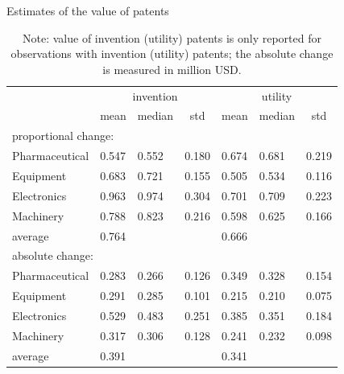 \documentclass[English]{article}
\begin{document}
\begin{table}[H]
\centering
\caption{Estimates of the value of patents}
\label{T18}
\begin{tabular}{lllcllc}
\hline\hline
                     &\multicolumn{3}{c}{invention} &\multicolumn{3}{c}{utility} \\
                        & mean  & median & std   & mean            & median & std   \\
\hline
\multicolumn{7}{l}{proportional change:} \\
Pharmaceutical & 0.547 & 0.552 & 0.180 & 0.674 & 0.681 & 0.219 \\
Equipment      & 0.683 & 0.721 & 0.155 & 0.505 & 0.534 & 0.116 \\
Electronics    & 0.963 & 0.974 & 0.304 & 0.701 & 0.709 & 0.223 \\
Machinery      & 0.788 & 0.823 & 0.216 & 0.598 & 0.625 & 0.166 \\
average        & 0.764 &       &       & 0.666 &       &       \\
\hline
\multicolumn{7}{l}{absolute change:} \\
Pharmaceutical & 0.283 & 0.266 & 0.126 & 0.349 & 0.328 & 0.154 \\
Equipment      & 0.291 & 0.285 & 0.101 & 0.215 & 0.210 & 0.075 \\
Electronics    & 0.529 & 0.483 & 0.251 & 0.385 & 0.351 & 0.184 \\
Machinery      & 0.317 & 0.306 & 0.128 & 0.241 & 0.232 & 0.098 \\
average        & 0.391 &       &       & 0.341 &       &       \\
\hline\hline
\end{tabular}
\caption*{\small{}Note: value of invention (utility) patents is only reported for observations with invention (utility) patents; the absolute change is measured in million USD.}{\small \par}
\end{table}
\end{document}
